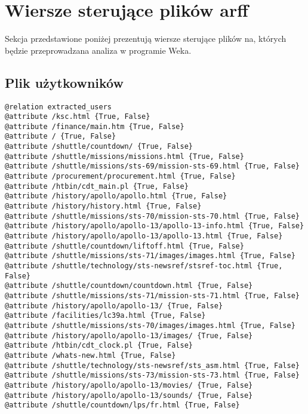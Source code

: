 \documentclass{classrep}
\begin{document}
    \section{Wiersze sterujące plików \textbf{arff}} {
        Sekcja przedstawione poniżej prezentują wiersze sterujące plików na, których
        będzie przeprowadzana analiza w programie Weka\cite{weka}.

        \subsection{Plik użytkowników} {
            \begin{lstlisting}
@relation extracted_users
@attribute /ksc.html {True, False}
@attribute /finance/main.htm {True, False}
@attribute / {True, False}
@attribute /shuttle/countdown/ {True, False}
@attribute /shuttle/missions/missions.html {True, False}
@attribute /shuttle/missions/sts-69/mission-sts-69.html {True, False}
@attribute /procurement/procurement.html {True, False}
@attribute /htbin/cdt_main.pl {True, False}
@attribute /history/apollo/apollo.html {True, False}
@attribute /history/history.html {True, False}
@attribute /shuttle/missions/sts-70/mission-sts-70.html {True, False}
@attribute /history/apollo/apollo-13/apollo-13-info.html {True, False}
@attribute /history/apollo/apollo-13/apollo-13.html {True, False}
@attribute /shuttle/countdown/liftoff.html {True, False}
@attribute /shuttle/missions/sts-71/images/images.html {True, False}
@attribute /shuttle/technology/sts-newsref/stsref-toc.html {True, False}
@attribute /shuttle/countdown/countdown.html {True, False}
@attribute /shuttle/missions/sts-71/mission-sts-71.html {True, False}
@attribute /history/apollo/apollo-13/ {True, False}
@attribute /facilities/lc39a.html {True, False}
@attribute /shuttle/missions/sts-70/images/images.html {True, False}
@attribute /history/apollo/apollo-13/images/ {True, False}
@attribute /htbin/cdt_clock.pl {True, False}
@attribute /whats-new.html {True, False}
@attribute /shuttle/technology/sts-newsref/sts_asm.html {True, False}
@attribute /shuttle/missions/sts-73/mission-sts-73.html {True, False}
@attribute /history/apollo/apollo-13/movies/ {True, False}
@attribute /history/apollo/apollo-13/sounds/ {True, False}
@attribute /shuttle/countdown/lps/fr.html {True, False}
            \end{lstlisting}
        }

}
\end{document}
